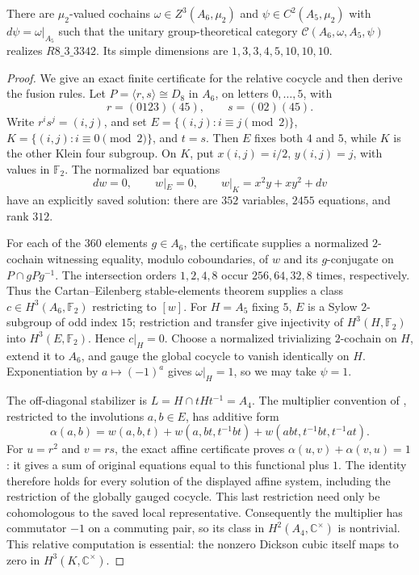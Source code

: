 \begin{theorem}\label{thm:m3-twisted-a6}
There are $\mu_2$-valued cochains $\omega\in Z^3(A_6,\mu_2)$ and
$\psi\in C^2(A_5,\mu_2)$ with $d\psi=\omega|_{A_5}$ such that the
unitary group-theoretical category
$\mathcal C(A_6,\omega,A_5,\psi)$ realizes $R8\_3\_3342$.
Its simple dimensions are $1,3,3,4,5,10,10,10$.
\end{theorem}
\begin{proof}
We give an exact finite certificate for the relative cocycle and then
derive the fusion rules. Let $P=\langle r,s\rangle\cong D_8$ in $A_6$,
on letters $0,\ldots,5$, with
\[
 r=(0123)(45),\qquad s=(02)(45).
\]
Write $r^is^j=(i,j)$, and set
$E=\{(i,j):i\equiv j\pmod2\}$,
$K=\{(i,j):i\equiv0\pmod2\}$, and $t=s$.
Then $E$ fixes both $4$ and $5$, while $K$ is the other Klein four
subgroup. On $K$, put $x(i,j)=i/2$, $y(i,j)=j$, with values in
$\mathbb F_2$. The normalized bar equations
\[
 dw=0,\qquad w|_E=0,\qquad w|_K=x^2y+xy^2+dv
\]
have an explicitly saved solution: there are $352$ variables,
$2455$ equations, and rank $312$.

For each of the $360$ elements $g\in A_6$, the certificate supplies a
normalized $2$-cochain witnessing equality, modulo coboundaries, of
$w$ and its $g$-conjugate on $P\cap gPg^{-1}$. The intersection orders
$1,2,4,8$ occur $256,64,32,8$ times, respectively. Thus the
Cartan--Eilenberg stable-elements theorem
\cite[Chapter XII, Section 10]{CartanEilenberg} supplies a class
$c\in H^3(A_6,\mathbb F_2)$ restricting to $[w]$.
For $H=A_5$ fixing $5$, $E$ is a Sylow $2$-subgroup of odd index $15$;
restriction and transfer give injectivity of $H^3(H,\mathbb F_2)$
into $H^3(E,\mathbb F_2)$. Hence $c|_H=0$.
Choose a normalized trivializing $2$-cochain on $H$, extend it to
$A_6$, and gauge the global cocycle to vanish identically on $H$.
Exponentiation by $a\mapsto(-1)^a$ gives $\omega|_H=1$, so we may
take $\psi=1$.

The off-diagonal stabilizer is $L=H\cap tHt^{-1}=A_4$.
The multiplier convention of \cite[Section 5.1]{GelakiNaidu}, restricted
to the involutions $a,b\in E$, has additive form
\[
 \alpha(a,b)=w(a,b,t)+w(a,bt,t^{-1}bt)
                   +w(abt,t^{-1}bt,t^{-1}at).
\]
For $u=r^2$ and $v=rs$, the exact affine certificate proves
$\alpha(u,v)+\alpha(v,u)=1$: it gives a sum of original equations
equal to this functional plus $1$. The identity therefore holds for
every solution of the displayed affine system, including the
restriction of the globally gauged cocycle. This last restriction
need only be cohomologous to the saved local representative.
Consequently the multiplier has commutator $-1$ on a commuting pair,
so its class in $H^2(A_4,\mathbb C^\times)$ is nontrivial.
This relative computation is essential: the nonzero Dickson cubic
itself maps to zero in $H^3(K,\mathbb C^\times)$.


\end{proof}
